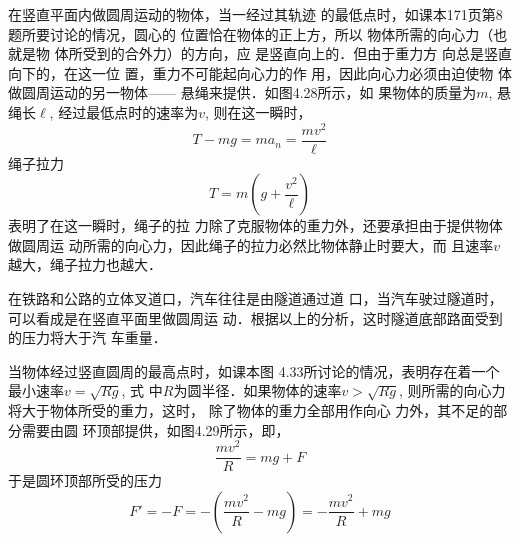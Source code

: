 在竖直平面内做圆周运动的物体，当一经过其轨迹
的最低点时，如课本171页第8题所要讨论的情况，圆心的
位置恰在物体的正上方，所以
物体所需的向心力（也就是物
体所受到的合外力）的方向，应
是竖直向上的．但由于重力方
向总是竖直向下的，在这一位
置，重力不可能起向心力的作
用，因此向心力必须由迫使物
体做圆周运动的另一物体——
悬绳来提供．如图4.28所示，如
果物体的质量为$m$, 悬绳长$\ell$, 经过最低点时的速率为$v$, 则在这一瞬时，
\[T-mg=ma_n=\frac{mv^2}{\ell}\]
绳子拉力
\[T=m\left(g+\frac{v^2}{\ell}\right)\]
表明了在这一瞬时，绳子的拉
力除了克服物体的重力外，还要承担由于提供物体做圆周运
动所需的向心力，因此绳子的拉力必然比物体静止时要大，而
且速率$v$越大，绳子拉力也越大．

\begin{figure}[htp]\centering
    \begin{minipage}[t]{0.48\textwidth}
    \centering
{}
    \caption{}
    \end{minipage}
    \begin{minipage}[t]{0.48\textwidth}
    \centering
    \caption{}
    \end{minipage}
    \end{figure}
在铁路和公路的立体叉道口，汽车往往是由隧道通过道
口，当汽车驶过隧道时，可以看成是在竖直平面里做圆周运
动．根据以上的分析，这时隧道底部路面受到的压力将大于汽
车重量．

当物体经过竖直圆周的最高点时，如课本图
4.33所讨论的情况，表明存在着一个最小速率$v=\sqrt{Rg}$, 式
中$R$为圆半径．如果物体的速率$v>\sqrt{Rg}$, 则所需的向心力
将大于物体所受的重力，这时，
除了物体的重力全部用作向心
力外，其不足的部分需要由圆
环顶部提供，如图4.29所示，即，
\[\frac{mv^2}{R}=mg+F\]
于是圆环顶部所受的压力
\[F'=-F=-\left(\frac{mv^2}{R}-mg\right)=-\frac{mv^2}{R}+mg\]

